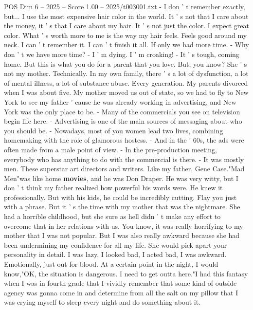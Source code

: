 \begin{textsample}{POS Dim 6 – 2025 – Score 1.00 – 2025/t003001.txt}  \label{ex:f6_pos_057}
- I don ' t remember exactly, but...
I use the most expensive hair color in the world.
It ' s not that I care about the money, it ' s that I care about my hair.
It ' s not just the color.
I expect great color.
What ' s worth more to me is the way my hair feels.
Feels good around my neck.
I can ' t remember it.
I can ' t finish it all.
If only we had more time. - Why don ' t we have more time? - I ' m dying.
I ' m croaking! - It ' s tough, coming home.
But this is what you do for a parent that you love.
But, you know?
She ' s not my mother.
Technically.
In my own family, there ' s a lot of dysfunction, a lot of mental illness, a lot of substance abuse.
Every generation.
My parents divorced when I was about five.
My mother moved us out of state, so we had to fly to New York to see my father ' cause he was already working in advertising, and New York was the only place to be. - Many of the commercials you see on television begin life here. - Advertising is one of the main sources of messaging about who you should be. - Nowadays, most of you women lead two lives, combining homemaking with the role of glamorous hostess. - And in the ' 60s, the ads were often made from a male point of view. - In the pre-production meeting, everybody who has anything to do with the commercial is there. - It was mostly men.
These superstar art directors and writers.
Like my father, Gene Case."Mad Men"was like home \textbf{movies}, and he was Don Draper.
He was very witty, but I don ' t think my father realized how powerful his words were.
He knew it professionally.
But with his kids, he could be incredibly cutting.
Flay you just with a phrase.
But it ' s the time with my mother that was the nightmare.
She had a horrible childhood, but she sure as hell didn ' t make any effort to overcome that in her relations with us.
You know, it was really horrifying to my mother that I was not popular.
But I was also really awkward because she had been undermining my confidence for all my life.
She would pick apart your personality in detail.
I was lazy, I looked bad, I acted bad, I was awkward.
Emotionally, just out for blood.
At a certain point in the night, I would know,"OK, the situation is dangerous.
I need to get outta here."I had this fantasy when I was in fourth grade that I vividly remember that some kind of outside agency was gonna come in and determine from all the salt on my pillow that I was crying myself to sleep every night and do something about it.

\end{textsample}
